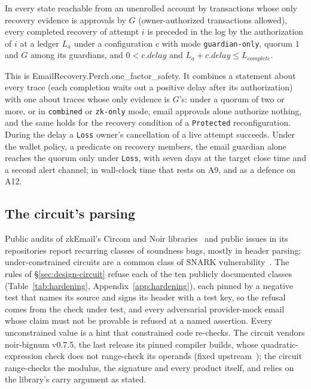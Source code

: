 \begin{theorem}\label{thm:onefactor}
In every state reachable from an unenrolled account by transactions whose only
recovery evidence is approvals by $G$ (owner-authorized transactions
allowed), every completed recovery of attempt $i$ is preceded in the log by
the authorization of $i$ at a ledger $L_a$ under a configuration $c$ with
mode \texttt{guardian-only}, quorum $1$ and $G$ among its guardians, and
$0 < c.\mathit{delay}$ and $L_a + c.\mathit{delay} \le L_\mathit{complete}$.
\end{theorem}
This is \textsf{EmailRecovery.\allowbreak Perch.\allowbreak one\_factor\_safety}.
It combines a statement about every trace (each completion waits out a
positive delay after its authorization) with one about traces whose only
evidence is $G$'s: under a quorum of two or more, or in \texttt{combined} or
\texttt{zk-only} mode, email approvals alone authorize nothing, and the same
holds for the recovery condition of a \texttt{Protected}
reconfiguration. During the delay a
\texttt{Loss} owner's cancellation of a live attempt
succeeds. Under the wallet policy, a predicate on
recovery members, the email guardian alone reaches the quorum only under
\texttt{Loss}, with seven days at the target close time and a second alert
channel; in wall-clock time that rests on
A9, and as a defence on A12.

\subsection{The circuit's parsing}\label{sec:hardening}
Public audits of zkEmail's Circom and Noir
libraries~\cite{audit-zksecurity-2024,audit-yacademy,audit-zellic-2024,audit-matterlabs-2024,audit-veridise-2024,audit-consensys-2024}
and public issues in its repositories report recurring classes of soundness
bugs, mostly in header parsing; under-constrained circuits are a common class
of SNARK vulnerability~\cite{chaliasos-sok-snark}. The rules of
\S\ref{sec:design-circuit} refuse each of the ten publicly documented classes
(Table~\ref{tab:hardening}, Appendix~\ref{app:hardening}), each pinned by a
negative test that names its source and signs its header with a test key, so
the refusal comes from the check under test, and every adversarial
provider-mock email whose claim must not be provable is refused at a named
assertion. Every
unconstrained value is a hint that constrained code re-checks. The circuit
vendors noir-bignum v0.7.5, the last release its pinned compiler builds,
whose quadratic-expression check does not range-check its operands (fixed
upstream~\cite{noir-bignum-pr270}); the circuit range-checks the modulus, the
signature and every product itself, and relies on the library's carry
argument as stated.

